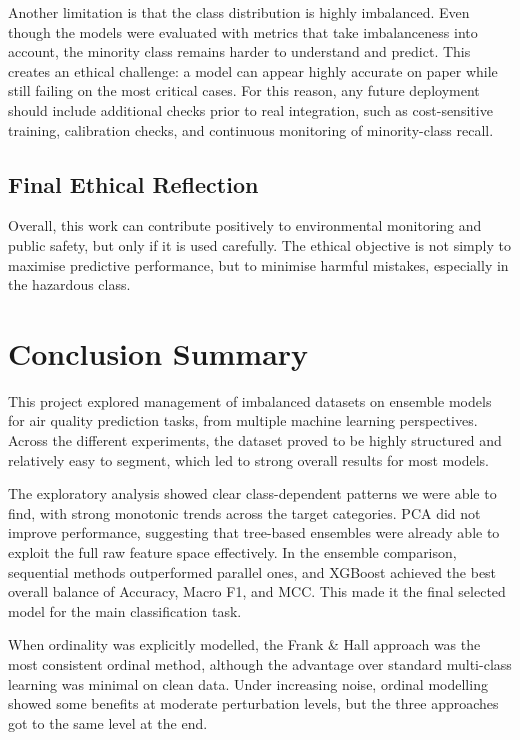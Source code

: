 \documentclass[a4paper,12pt]{article}
\begin{document}
	Another limitation is that the class distribution is highly imbalanced. Even though the models were evaluated with metrics that take imbalanceness into account, the minority class remains harder to understand and predict. This creates an ethical challenge: a model can appear highly accurate on paper while still failing on the most critical cases. For this reason, any future deployment should include additional checks prior to real integration, such as cost-sensitive training, calibration checks, and continuous monitoring of minority-class recall.
	

	
	\subsection{Final Ethical Reflection}
	
	Overall, this work can contribute positively to environmental monitoring and public safety, but only if it is used carefully. The ethical objective is not simply to maximise predictive performance, but to minimise harmful mistakes, especially in the hazardous class.
	
	\section{Conclusion Summary}
	
	This project explored management of imbalanced datasets on ensemble models for air quality prediction tasks, from multiple machine learning perspectives. Across the different experiments, the dataset proved to be highly structured and relatively easy to segment, which led to strong overall results for most models.
	
	The exploratory analysis showed clear class-dependent patterns we were able to find, with strong monotonic trends across the target categories. PCA did not improve performance, suggesting that tree-based ensembles were already able to exploit the full raw feature space effectively. In the ensemble comparison, sequential methods outperformed parallel ones, and XGBoost achieved the best overall balance of Accuracy, Macro F1, and MCC. This made it the final selected model for the main classification task.
	
	When ordinality was explicitly modelled, the Frank \& Hall approach was the most consistent ordinal method, although the advantage over standard multi-class learning was minimal on clean data. Under increasing noise, ordinal modelling showed some benefits at moderate perturbation levels, but the three approaches got to the same level at the end.
	
\end{document}
